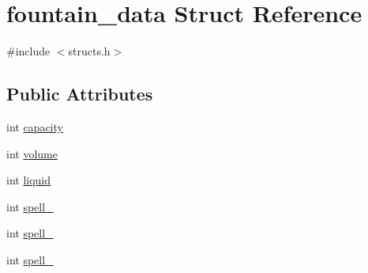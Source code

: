 \hypertarget{structfountain__data}{\section{fountain\-\_\-data Struct Reference}
\label{structfountain__data}
}


{\ttfamily \#include $<$structs.\-h$>$}

\subsection*{Public Attributes}
\begin{DoxyCompactItemize}
\item 
int \hyperlink{structfountain__data_a8ba520a6a8cc4ab2c6167e43bb914122}{capacity}
\item 
int \hyperlink{structfountain__data_ac08752e636ab5a427ff7d7ac83183bd9}{volume}
\item 
int \hyperlink{structfountain__data_a006ae5eac053f0c50a1667e9bf39adbc}{liquid}
\item 
int \hyperlink{structfountain__data_a4395698ebcfb50308bbe6892de853bd0}{spell\-\_}
\item 
int \hyperlink{structfountain__data_aa9c2312107a9f55a29185d73f224efd5}{spell\-\_}
\item 
int \hyperlink{structfountain__data_adf2c8f707cd32b9efd5f6a0aa69bcbef}{spell\-\_}
\end{DoxyCompactItemize}


